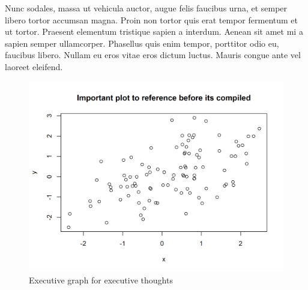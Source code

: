 \documentclass[
]{article}
\begin{document}
Nunc sodales, massa ut vehicula auctor, augue felis faucibus urna, et
semper libero tortor accumsan magna. Proin non tortor quis erat tempor
fermentum et ut tortor. Praesent elementum tristique sapien a interdum.
Aenean sit amet mi a sapien semper ullamcorper. Phasellus quis enim
tempor, porttitor odio eu, faucibus libero. Nullam eu eros vitae eros
dictum luctus. Mauris congue ante vel laoreet eleifend.

\begin{figure}[H]

{\centering \includegraphics[width=0.9\linewidth]{cookbook_files/figure-latex/chunk-a-1} 

}

\caption{Executive graph for executive thoughts}\label{fig:chunk-a}
\end{figure}
\end{document}

